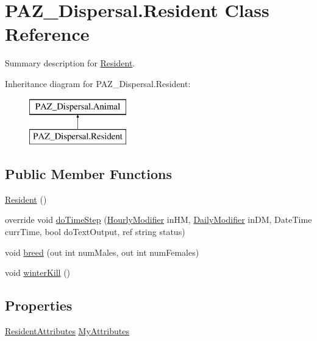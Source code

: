 \hypertarget{class_p_a_z___dispersal_1_1_resident}{\section{P\-A\-Z\-\_\-\-Dispersal.\-Resident Class Reference}
\label{class_p_a_z___dispersal_1_1_resident}
}


Summary description for \hyperlink{class_p_a_z___dispersal_1_1_resident}{Resident}.  


Inheritance diagram for P\-A\-Z\-\_\-\-Dispersal.\-Resident\-:\begin{figure}[H]
\begin{center}
\leavevmode
\includegraphics[height=2.000000cm]{class_p_a_z___dispersal_1_1_resident}
\end{center}
\end{figure}
\subsection*{Public Member Functions}
\begin{DoxyCompactItemize}
\item 
\hyperlink{class_p_a_z___dispersal_1_1_resident_a761906935112cf4bd8421752f446d75b}{Resident} ()
\item 
override void \hyperlink{class_p_a_z___dispersal_1_1_resident_a82d5c8a08cd04495428744cafc31aa51}{do\-Time\-Step} (\hyperlink{class_p_a_z___dispersal_1_1_hourly_modifier}{Hourly\-Modifier} in\-H\-M, \hyperlink{class_p_a_z___dispersal_1_1_daily_modifier}{Daily\-Modifier} in\-D\-M, Date\-Time curr\-Time, bool do\-Text\-Output, ref string status)
\item 
void \hyperlink{class_p_a_z___dispersal_1_1_resident_a206224b8bd56106873a978eea230f217}{breed} (out int num\-Males, out int num\-Females)
\item 
void \hyperlink{class_p_a_z___dispersal_1_1_resident_a2b947c0ee5744ede6fca2a9491e439f1}{winter\-Kill} ()
\end{DoxyCompactItemize}
\subsection*{Properties}
\begin{DoxyCompactItemize}
\item 
\hyperlink{class_p_a_z___dispersal_1_1_resident_attributes}{Resident\-Attributes} \hyperlink{class_p_a_z___dispersal_1_1_resident_ab41088e0fa32aaecd016e1f1845d7d2f}{My\-Attributes}
\end{DoxyCompactItemize}
